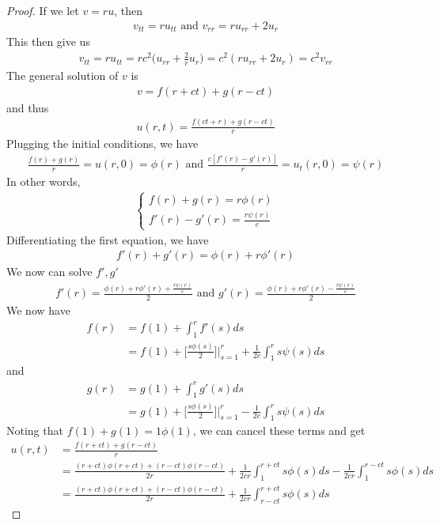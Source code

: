 \documentclass{report}
\begin{document}
\begin{proof}
If we let $v=ru$, then 
 \begin{align*}
v_{tt}=ru_{tt}\text{ and }v_{rr}=ru_{rr}+2u_r
\end{align*}
This then give us 
\begin{align*}
v_{tt}=ru_{tt}=rc^2\Big(u_{rr}+\frac{2}{r}u_r \Big)=c^2(ru_{rr}+2u_r)=c^2v_{rr}
\end{align*}
The general solution of $v$ is 
\begin{align*}
v=f(r+ct)+g(r-ct)
\end{align*}
and thus 
\begin{align*}
u(r,t)= \frac{f(ct+r)+g(r-ct)}{r}
\end{align*}
Plugging the initial conditions, we have 
\begin{align*}
\frac{f(r)+g(r)}{r}=u(r,0)=\phi (r)\text{ and }\frac{c[f'(r)-g'(r)]}{r}=u_t(r,0)=\psi (r)
\end{align*}
In other words, 
\begin{align*}
\begin{cases}
  f(r)+g(r)=r\phi (r)\\
  f'(r)-g'(r)=\frac{r \psi (r)}{c}
\end{cases}
\end{align*}
Differentiating the first equation, we have  
\begin{align*}
  f'(r)+g'(r)= \phi (r)+r\phi'(r)
\end{align*}
We now can solve $f',g'$ 
\begin{align*}
f'(r)= \frac{\phi (r)+r\phi '(r)+ \frac{r\psi (r)}{c}}{2}\text{ and }g'(r)= \frac{\phi (r)+r\phi'(r)- \frac{r\psi (r)}{c}}{2}
\end{align*}
We now have 
\begin{align*}
f(r)&= f(1)+\int_1^{r} f'(s)ds   \\
&=f(1)+ \Big[\frac{s \phi (s)}{2} \Big] \Big|_{s=1}^{r} + \frac{1}{2c}\int_1^r s \psi (s)ds
\end{align*}
and 
\begin{align*}
g(r)&=g(1)+ \int_1^r g'(s)ds \\
&=g(1)+ \Big[ \frac{s \phi (s)}{2} \Big]\Big|_{s=1}^r -\frac{1}{2c}\int_1^r s\psi (s)ds
\end{align*}
Noting that $f(1)+g(1)=1\phi (1)$, we can cancel these terms and get 
\begin{align*}
u(r,t)&= \frac{f(r+ct)+g(r-ct)}{r} \\
&= \frac{(r+ct)\phi (r+ct)+ (r-ct)\phi (r-ct)}{2r}+ \frac{1}{2cr}\int_1^{r+ct}s \phi (s)ds - \frac{1}{2cr}\int_1^{r-ct}s\phi (s)ds\\
&=\frac{(r+ct)\phi (r+ct)+ (r-ct)\phi (r-ct)}{2r}+ \frac{1}{2cr}\int_{r-ct}^{r+ct}s \phi (s)ds 
\end{align*}
\end{proof}
\end{document}
